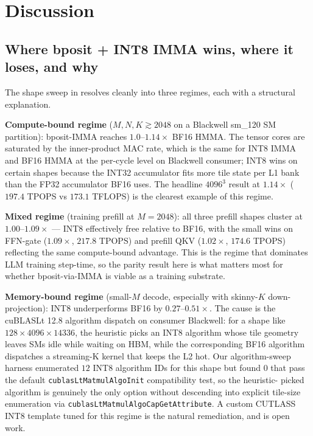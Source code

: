 \documentclass[11pt,a4paper]{article}
\newcommand{\TPOPS}{\textsf{TPOPS}}
\newcommand{\TFLOPS}{\textsf{TFLOPS}}
\begin{document}
\section{Discussion}
\label{sec:discussion}

\subsection{Where bposit + INT8 IMMA wins, where it loses, and why}

The shape sweep in  resolves cleanly into three
regimes, each with a structural explanation.

\textbf{Compute-bound regime} ($M, N, K \gtrsim 2048$ on a Blackwell
sm\_120 SM partition): bposit-IMMA reaches $1.0\text{--}1.14\times$
BF16 HMMA. The tensor cores are saturated by the inner-product MAC
rate, which is the same for INT8 IMMA and BF16 HMMA at the per-cycle
level on Blackwell consumer; INT8 wins on certain shapes because the
INT32 accumulator fits more tile state per L1 bank than the FP32
accumulator BF16 uses. The headline $4096^3$ result at
\textbf{$1.14\times$} ($197.4$ \TPOPS{} vs $173.1$ \TFLOPS{}) is the
clearest example of this regime.

\textbf{Mixed regime} (training prefill at $M = 2048$): all three
prefill shapes cluster at $1.00\text{--}1.09\times$ — INT8 effectively
free relative to BF16, with the small wins on FFN-gate
($1.09\times$, $217.8$ \TPOPS{}) and prefill QKV ($1.02\times$,
$174.6$ \TPOPS{}) reflecting the same compute-bound advantage. This
is the regime that dominates LLM training step-time, so the parity
result here is what matters most for whether bposit-via-IMMA is
viable as a training substrate.

\textbf{Memory-bound regime} (small-$M$ decode, especially with
skinny-$K$ down-projection): INT8 underperforms BF16 by
$0.27\text{--}0.51\times$. The cause is the cuBLASLt 12.8 algorithm
dispatch on consumer Blackwell: for a shape like
$128 \times 4096 \times 14336$, the heuristic picks an INT8 algorithm
whose tile geometry leaves SMs idle while waiting on HBM, while the
corresponding BF16 algorithm dispatches a streaming-K kernel that
keeps the L2 hot. Our algorithm-sweep harness enumerated $12$ INT8
algorithm IDs for this shape but found $0$ that pass the default
\texttt{cublasLtMatmulAlgoInit} compatibility test, so the heuristic-
picked algorithm is genuinely the only option without descending into
explicit tile-size enumeration via
\texttt{cublasLtMatmulAlgoCapGetAttribute}. A custom CUTLASS INT8
template tuned for this regime is the natural remediation, and is
open work.
\end{document}
